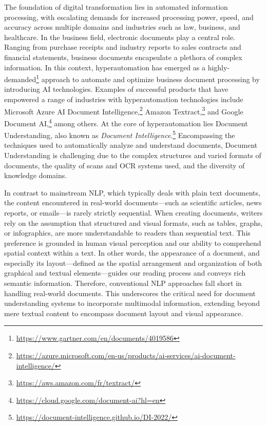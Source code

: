 The foundation of digital transformation lies in automated information processing, with escalating demands for increased processing power, speed, and accuracy across multiple domains and industries such as law, business, and healthcare. In the business field, electronic documents play a central role. Ranging from purchase receipts and industry reports to sales contracts and financial statements, business documents encapsulate a plethora of complex information. In this context, hyperautomation has emerged as a highly-demanded\footnote{\url{https://www.gartner.com/en/documents/4019586}} approach to automate and optimize business document processing by introducing \ac{AI} technologies. Examples of successful products that have empowered a range of industries with hyperautomation technologies include Microsoft Azure AI Document Intelligence,\footnote{\url{https://azure.microsoft.com/en-us/products/ai-services/ai-document-intelligence/}} Amazon Textract,\footnote{\url{https://aws.amazon.com/fr/textract/}} and Google Document AI,\footnote{\url{https://cloud.google.com/document-ai?hl=en}} among others. At the core of hyperautomation lies Document Understanding, also known as \textit{Document Intelligence}.\footnote{\url{https://document-intelligence.github.io/DI-2022/}} Encompassing the techniques used to automatically analyze and understand documents, Document Understanding is challenging due to the complex structures and varied formats of documents, the quality of scans and \ac{OCR} systems used, and the diversity of knowledge domains.

In contrast to mainstream \ac{NLP}, which typically deals with plain text documents, the content encountered in real-world documents—such as scientific articles, news reports, or emails—is rarely strictly sequential. When creating documents, writers rely on the assumption that structured and visual formats, such as tables, graphs, or infographics, are more understandable to readers than sequential text. This preference is grounded in human visual perception and our ability to comprehend spatial context within a text. In other words, the appearance of a document, and especially its layout—defined as the spatial arrangement and organization of both graphical and textual elements—guides our reading process and conveys rich semantic information. Therefore, conventional \ac{NLP} approaches fall short in handling real-world documents. This underscores the critical need for document understanding systems to incorporate multimodal information, extending beyond mere textual content to encompass document layout and visual appearance.


